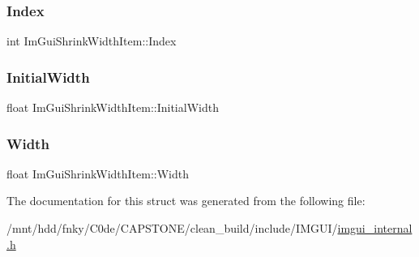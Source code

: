 \subsubsection{\texorpdfstring{Index}{Index}}
{\footnotesize\ttfamily int Im\+Gui\+Shrink\+Width\+Item\+::\+Index}

\mbox{\label{structImGuiShrinkWidthItem_ac9a3ca20449e58374963f32db20bbd87}} 
\subsubsection{\texorpdfstring{Initial\+Width}{InitialWidth}}
{\footnotesize\ttfamily float Im\+Gui\+Shrink\+Width\+Item\+::\+Initial\+Width}

\mbox{\label{structImGuiShrinkWidthItem_a29ba0dc283a3f57b0725b371f73fe1ed}} 
\subsubsection{\texorpdfstring{Width}{Width}}
{\footnotesize\ttfamily float Im\+Gui\+Shrink\+Width\+Item\+::\+Width}



The documentation for this struct was generated from the following file\+:\begin{DoxyCompactItemize}
\item 
/mnt/hdd/fnky/\+C0de/\+C\+A\+P\+S\+T\+O\+N\+E/clean\+\_\+build/include/\+I\+M\+G\+U\+I/\hyperlink{imgui__internal_8h}{imgui\+\_\+internal.\+h}\end{DoxyCompactItemize}
